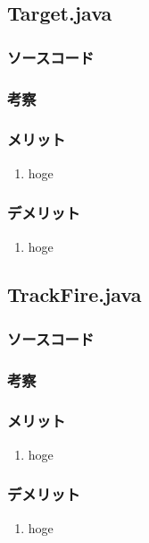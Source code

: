 \documentclass[12pt]{jarticle} %
\begin{document}
\begin{flushleft}
\subsection{Target.java}
\subsubsection{ソースコード}

\subsubsection{考察}
\subsubsection{メリット}
\begin{enumerate}
\item hoge
\end{enumerate}
\subsubsection{デメリット}
\begin{enumerate}
\item hoge
\end{enumerate}

\subsection{TrackFire.java}
\subsubsection{ソースコード}

\subsubsection{考察}
\subsubsection{メリット}
\begin{enumerate}
\item hoge
\end{enumerate}
\subsubsection{デメリット}
\begin{enumerate}
\item hoge
\end{enumerate}


\end{flushleft}
\end{document}
